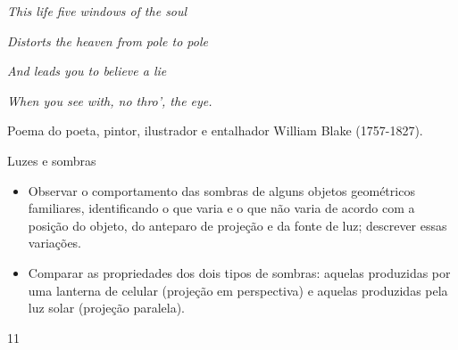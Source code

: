 \begin{reflection}{}

\begin{DUlineblock}{0em}
\item[] \emph{This life five windows of the soul}
\item[] \emph{Distorts the heaven from pole to pole}
\item[] \emph{And leads you to believe a lie}
\item[] \emph{When you see with, no thro’, the eye.}
\end{DUlineblock}

Poema do poeta, pintor, ilustrador e entalhador William Blake (1757-1827).
\end{reflection}

\cleardoublepage
\def\currentcolor{session1}
\begin{objectives}{Luzes e sombras}
{
\begin{itemize}
\item {} 
Observar o comportamento das sombras de alguns objetos geométricos familiares, identificando o que varia e o que não varia de acordo com a posição do objeto, do anteparo de projeção e da fonte de luz; descrever essas variações.

\item {} 
Comparar as propriedades dos dois tipos de sombras: aquelas produzidas por uma lanterna de celular (projeção em perspectiva) e aquelas produzidas pela luz solar (projeção paralela).

\end{itemize}
}{1}{1}
\end{objectives}
